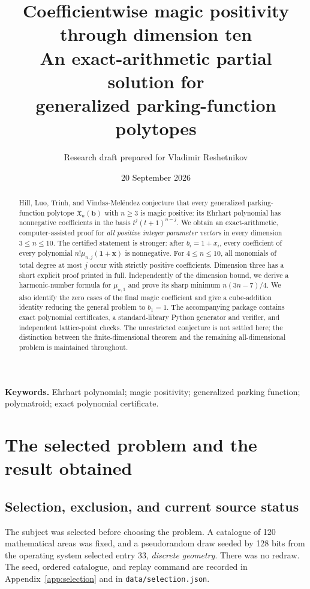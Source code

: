 \documentclass[11pt]{article}
\title{\LARGE\bfseries\color{Ink}Coefficientwise magic positivity\\through dimension ten\\[0.45em]
\large An exact-arithmetic partial solution for\\generalized parking-function polytopes}
\author{Research draft prepared for Vladimir Reshetnikov}
\date{20 September 2026}
\theoremstyle{definition}
\newcommand{\bb}{\mathbf b}
\newcommand{\xx}{\mathbf x}
\newcommand{\one}{\mathbf 1}
\newcommand{\X}{\mathfrak X}
\numberwithin{equation}{section}
\begin{document}
\maketitle
\begin{abstract}
Hill, Luo, Trinh, and Vindas-Mel\'endez conjecture that every generalized
parking-function polytope $\X_n(\bb)$ with $n\ge3$ is magic positive: its Ehrhart
polynomial has nonnegative coefficients in the basis
$t^j(t+1)^{n-j}$. We obtain an exact-arithmetic, computer-assisted proof for
\emph{all positive integer parameter vectors} in every dimension $3\le n\le10$.
The certified statement is stronger: after $b_i=1+x_i$, every coefficient of
every polynomial $n!\mu_{n,j}(\one+\xx)$ is nonnegative. For $4\le n\le10$,
all monomials of total degree at most $j$ occur with strictly positive
coefficients. Dimension three has a short explicit proof printed in full.
Independently of the dimension bound, we derive a harmonic-number formula for
$\mu_{n,1}$ and prove its sharp minimum $n(3n-7)/4$. We also identify the zero
cases of the final magic coefficient and give a cube-addition identity reducing
the general problem to $b_1=1$. The accompanying package contains exact
polynomial certificates, a standard-library Python generator and verifier,
and independent lattice-point checks. The unrestricted conjecture is not
settled here; the distinction between the finite-dimensional theorem and the
remaining all-dimensional problem is maintained throughout.
\end{abstract}

\noindent\textbf{Keywords.} Ehrhart polynomial; magic positivity; generalized
parking function; polymatroid; exact polynomial certificate.

\setcounter{tocdepth}{1}
\begingroup
\setlength{\parskip}{0pt}
\small
\tableofcontents
\endgroup
\clearpage

\section{The selected problem and the result obtained}
\label{sec:problem}

\subsection{Selection, exclusion, and current source status}
The subject was selected before choosing the problem. A catalogue of 120
mathematical areas was fixed, and a pseudorandom draw seeded by 128 bits from the
operating system selected entry 33, \emph{discrete geometry}. There was no
redraw. The seed, ordered catalogue, and replay command are recorded in
Appendix~\ref{app:selection} and in \texttt{data/selection.json}.
\end{document}
